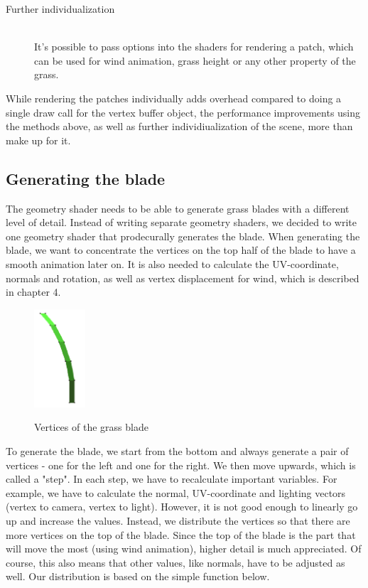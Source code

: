 \documentclass[conference]{acmsiggraph}
\begin{document}
\begin{description}
  \item[Further individualization] \hfill \\
	It's possible to pass options into the shaders for rendering a patch, which can be used for wind animation, grass height or any other property of the grass.
\end{description}

While rendering the patches individually adds overhead compared to doing a single draw call for the vertex buffer object, the performance improvements using the methods above, as well as further individiualization of the scene, more than make up for it.

\subsection{Generating the blade}
The geometry shader needs to be able to generate grass blades with a different level of detail. Instead of writing separate geometry shaders, we decided to write one geometry shader that prodecurally generates the blade. When generating the blade, we want to concentrate the vertices on the top half of the blade to have a smooth animation later on. It is also needed to calculate the UV-coordinate, normals and rotation, as well as vertex displacement for wind, which is described in chapter 4.

 \begin{figure}[ht]
   \centering
   \includegraphics[width=0.75in]{images/grass_blade_vertices}
   \caption{Vertices of the grass blade} \cite{EddieLee}
 \end{figure}

To generate the blade, we start from the bottom and always generate a pair of vertices - one for the left and one for the right. We then move upwards, which is called a "step". In each step, we have to recalculate important variables. For example, we have to calculate the normal, UV-coordinate and lighting vectors (vertex to camera, vertex to light). However, it is not good enough to linearly go up and increase the values. Instead, we distribute the vertices so that there are more vertices on the top of the blade. Since the top of the blade is the part that will move the most (using wind animation), higher detail is much appreciated. Of course, this also means that other values, like normals, have to be adjusted as well. Our distribution is based on the simple function below.
\end{document}
